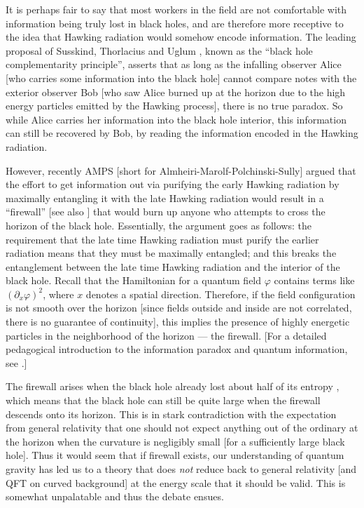 \documentclass[12pt]{article}
\newcommand{\2}{$^2$}
\newcommand{\3}{$^3$}
\newcommand{\4}{$_4$}
\newcommand{\5}{$_5$}
\begin{document}
It is perhaps fair to say that most workers in the field are not comfortable with information being truly lost in black holes, and are therefore more receptive to the idea that Hawking radiation would somehow encode information. The leading proposal of Susskind, Thorlacius and Uglum \cite{STU}, known as the ``black hole complementarity principle'', asserts that as long as the infalling observer Alice [who carries some information into the black hole] cannot compare notes with the exterior observer Bob [who saw Alice burned up at the horizon due to the high energy particles emitted by the Hawking process], there is no true paradox. So while Alice carries her information into the black hole interior, this information can still be recovered by Bob, by reading the information encoded in the Hawking radiation.

However, recently AMPS [short for Almheiri-Marolf-Polchinski-Sully] \cite{amps, apologia} argued that the effort to get information out via purifying the early Hawking radiation by maximally entangling it with the late Hawking radiation would result in a ``firewall''  [see also \cite{sam}] that would burn up anyone who attempts to cross the horizon of the black hole. Essentially, the argument goes as follows: the requirement that the late time Hawking radiation must purify the earlier radiation means that they must be maximally entangled; and this breaks the entanglement between the late time Hawking radiation and the interior of the black hole. Recall that the Hamiltonian for a quantum field $\varphi$ contains terms like $(\partial_x \varphi)^2$, where $x$ denotes a spatial direction. Therefore, if the field configuration is not smooth over the horizon [since fields outside and inside are not correlated, there is no guarantee of continuity], this implies the presence of highly energetic particles in the neighborhood of the horizon --- the firewall. [For a detailed pedagogical introduction to the information paradox and quantum information, see \cite{harlow}.]

The firewall arises when the black hole already lost about half of its entropy \cite{page1, page2}, which means that the black hole can still be quite large when the firewall descends onto its horizon. This is in stark contradiction with the expectation from general relativity that one should not expect anything out of the ordinary at the horizon when the curvature is negligibly small [for a sufficiently large black hole]. Thus it would seem that if firewall exists, our understanding of quantum gravity has led us to a theory that does \emph{not} reduce back to general relativity [and QFT on curved background] at the energy scale that it should be valid. This is somewhat unpalatable and thus the debate ensues. 
\end{document}
